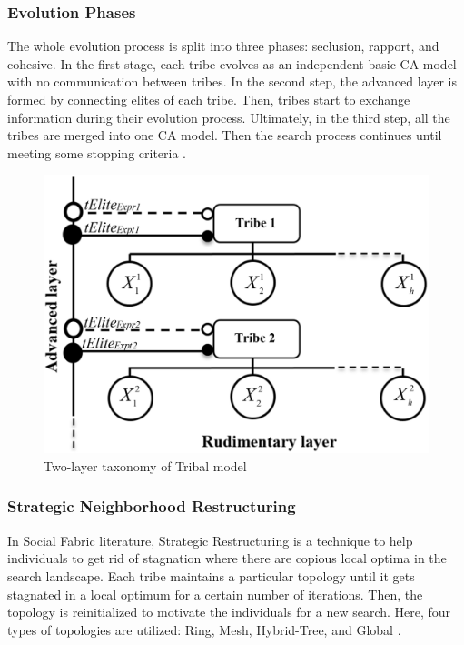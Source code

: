 \documentclass[letterpaper]{article}
\begin{document}
\subsubsection{Evolution Phases}
The whole evolution process is split into three phases: seclusion, rapport, and cohesive. In the first stage, each tribe evolves as an independent basic CA model with no communication between tribes. In the second step, the advanced layer is formed by connecting elites of each tribe. Then, tribes start to exchange information during their evolution process. Ultimately, in the third step, all the tribes are merged into one CA model. Then the search process continues until meeting some stopping criteria \cite{chen2006tribe} \cite{ali2016leveraged}.
\begin{figure}[h]
	\includegraphics[scale=0.21]{twoLayer}
	\centering
	\caption{Two-layer taxonomy of Tribal model \cite{ali2016leveraged}}
	\label{ref:twoLayer}
\end{figure}
\subsubsection{Strategic Neighborhood Restructuring}
In  Social Fabric literature, Strategic Restructuring is a technique to help individuals to get rid of stagnation where there are copious local optima in the search landscape. Each tribe maintains a particular topology until it gets stagnated in a local optimum for a certain number of iterations. Then, the topology is reinitialized to motivate the individuals for a new search. Here, four types of topologies are utilized: Ring, Mesh, Hybrid-Tree, and Global \cite{ali2012socio} \cite{ali2016leveraged}. \newline
\end{document}
